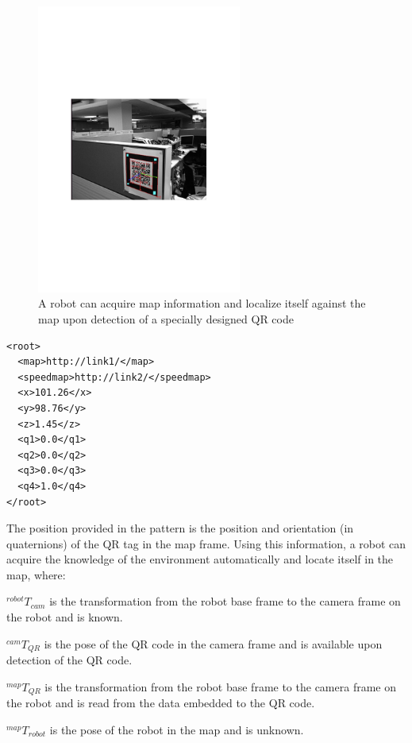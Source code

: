 \begin{figure}[ht!]
\centering
\includegraphics[width=0.6\textwidth]{pics/qrcode}
\caption{A robot can acquire map information and localize itself against the map upon detection of a specially designed QR code}
\label{fig:qr}
\end{figure}

\begin{lstlisting}
<root>
  <map>http://link1/</map>
  <speedmap>http://link2/</speedmap>
  <x>101.26</x>
  <y>98.76</y>
  <z>1.45</z>
  <q1>0.0</q1>
  <q2>0.0</q2>
  <q3>0.0</q3>
  <q4>1.0</q4>
</root>
\end{lstlisting}


The position provided in the pattern is the position and orientation (in quaternions) of the QR tag in the map frame. Using this information, a robot can acquire the knowledge of the environment automatically and locate itself in the map, where:

$^{robot}T_{cam}$ is the transformation from the robot base frame to the camera frame on the robot and is known.

$^{cam}T_{QR}$ is the pose of the QR code in the camera frame and is available upon detection of the QR code.

$^{map}T_{QR}$ is the transformation from the robot base frame to the camera frame on the robot and is read from the data embedded to the QR code.

$^{map}T_{robot}$ is the pose of the robot in the map and is unknown.\\

